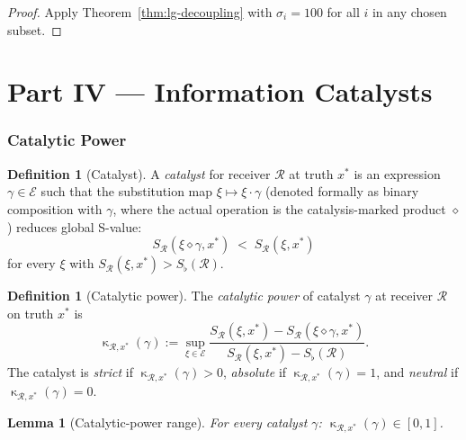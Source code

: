 \documentclass[twocolumn,11pt,a4paper]{article}
\theoremstyle{thmstyle}
\newtheorem{lemma}[theorem]{Lemma}
\theoremstyle{thmstyle}
\theoremstyle{definition}
\newtheorem{definition}[theorem]{Definition}
\theoremstyle{remark}
\DeclareMathOperator{\catpow}{\kappa}
\newcommand{\Expr}{\mathcal{E}}
\newcommand{\receiver}{\mathcal{R}}
\newcommand{\Sscalar}{S}
\newcommand{\Sfloor}{S_{\flat}}
\begin{document}
\begin{proof}
Apply Theorem~\ref{thm:lg-decoupling} with
$\sigma_{i} = 100$ for all $i$ in any chosen subset.
\end{proof}



\part*{Part IV --- Information Catalysts}

\section{Catalytic Power}
\label{sec:catalytic-power}

\begin{definition}[Catalyst]\label{def:catalyst}
A \emph{catalyst} for receiver $\receiver$ at truth
$x^{*}$ is an expression $\gamma \in \Expr$ such that
the substitution map
$\xi \mapsto \xi \cdot \gamma$ (denoted formally as
binary composition with $\gamma$, where the actual
operation is the catalysis-marked product
$\diamond$) reduces global S-value:
\[
\Sscalar_{\receiver}(\xi \diamond \gamma, x^{*})
\;<\; \Sscalar_{\receiver}(\xi, x^{*})
\]
for every $\xi$ with $\Sscalar_{\receiver}(\xi, x^{*})
> \Sfloor(\receiver)$.
\end{definition}

\begin{definition}[Catalytic power]\label{def:catalytic-power}
The \emph{catalytic power} of catalyst $\gamma$ at
receiver $\receiver$ on truth $x^{*}$ is
\[
\catpow_{\receiver, x^{*}}(\gamma)
:= \sup_{\xi \in \Expr}
\frac{\Sscalar_{\receiver}(\xi, x^{*})
       - \Sscalar_{\receiver}(\xi \diamond \gamma, x^{*})}
     {\Sscalar_{\receiver}(\xi, x^{*}) - \Sfloor(\receiver)}.
\]
The catalyst is \emph{strict} if
$\catpow_{\receiver, x^{*}}(\gamma) > 0$, \emph{absolute} if
$\catpow_{\receiver, x^{*}}(\gamma) = 1$, and \emph{neutral}
if $\catpow_{\receiver, x^{*}}(\gamma) = 0$.
\end{definition}

\begin{lemma}[Catalytic-power range]\label{lem:cat-power-range}
For every catalyst $\gamma$:
$\catpow_{\receiver, x^{*}}(\gamma) \in [0, 1]$.
\end{lemma}
\end{document}
